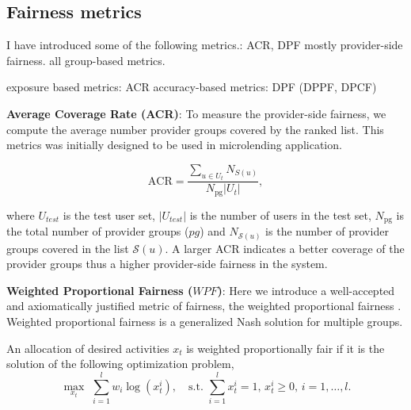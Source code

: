     
    \subsection{Fairness metrics}
    
        
        I have introduced some of the following metrics.: ACR, DPF
        mostly provider-side fairness.
        all group-based metrics.
        
        exposure based metrics: ACR
        accuracy-based metrics: DPF (DPPF, DPCF)
        
        
        
        \textbf{Average Coverage Rate (ACR)}: To measure the provider-side fairness, we compute the average number provider groups covered by the ranked list. This metrics was initially designed to be used in microlending application.
        
        \begin{equation}
            \text{ACR}=\frac{\sum_{u\in U_t}N_{S(u)}}{N_\text{pg}|U_t|},
        \end{equation}
        
        where $U_{test}$ is the test user set, $|U_{test}|$ is the number of users in the test set, $N_\text{pg}$ is the total number of provider groups ($pg$) and $N_{\mathcal{S}(u)}$ is the number of provider groups covered in the list $\mathcal{S}(u)$. A larger ACR indicates a better coverage of the provider groups thus a higher provider-side fairness in the system.
        
        
        \textbf{Weighted Proportional Fairness ($WPF$)}: Here we introduce a well-accepted and axiomatically justified metric of fairness, the weighted proportional fairness \cite{kelly1998rate}. Weighted proportional fairness is a generalized Nash solution for multiple groups.
        
        \begin{definition}
        An allocation of desired activities $x_t$ is weighted proportionally fair if it is the solution of the following optimization problem,
        \begin{equation}\label{eq:fairness}
            \max_{x_t}\,\, \sum_{i=1}^lw_i\log(x^i_t), \quad\text{s.t.}\,\,\sum_{i=1}^lx^i_t = 1,\, x^i_t\geq0,\,i=1,\ldots,l.
        \end{equation}
        \end{definition}
        

